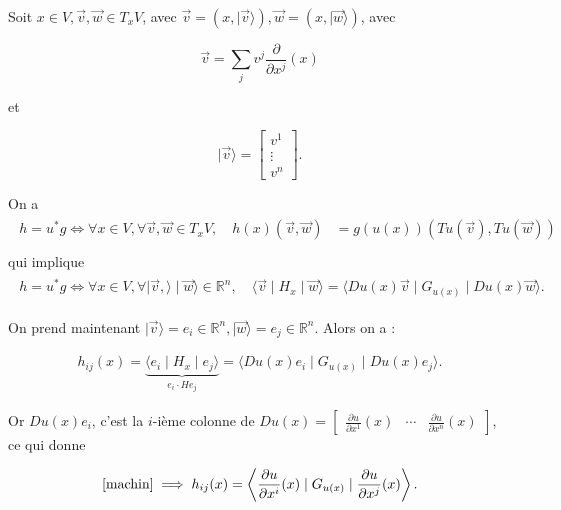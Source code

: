 \documentclass[french]{article}
\theoremstyle{definition}
\newcommand{\R}{\mathbb{R}}
\begin{document}
\medskip

Soit \(x \in V,  \vec{v}, \vec{w} \in T_x V\), avec \(\vec{v} = (x,\mid \vec{v} \rangle), \vec{w} = (x, \mid \vec{w} \rangle)\), avec

\[\vec{v}  = \sum_{j}^{} v ^{j} \frac{\partial  }{\partial x ^{j}}(x)\]

et

\[\mid \vec{v} \rangle = \begin{bmatrix}
  v ^{1} \\
  \vdots \\
  v ^{n}
\end{bmatrix}.\]

On a
\begin{gather*}
\begin{aligned}
h = u ^{*}g \iff \forall x \in V, \forall \vec{v}, \vec{w} \in T_x V,\quad  h(x)(\vec{v}, \vec{w}) & = g(u(x))(T u (\vec{v}), T u (\vec{w})) \\ &  \end{aligned}
\end{gather*}
qui implique
\begin{gather*}
\begin{aligned}
h = u ^{*}g \iff \forall x \in V, \forall \mid \vec{v},\rangle \mid  \vec{w} \rangle \in \R^n ,\quad  \langle \vec{v} \mid H_x \mid  \vec{w}\rangle  = \langle D u(x)\vec{v} \mid G_{u(x)} \mid D u(x)\vec{w}\rangle.
\end{aligned}
\end{gather*}

On prend maintenant \(\mid \vec{v} \rangle = e_i \in \mathbb{R}^n, \mid \vec{w} \rangle = e_j \in \mathbb{R}^n\). Alors on a :

\begin{gather}\label{machin}
h _{ij}(x) =  \underbrace{\langle e_i \mid  H_x \mid e_j \rangle}_{e_i \cdot H e_j} =  \langle D u(x)e_i \mid G_{u(x)} \mid D u(x)e_j\rangle.
\end{gather}

Or \(D u(x)e_i\), c'est la \(i\)-ième colonne de \(  D u(x) = \begin{bmatrix} \displaystyle \frac{\partial u }{\partial x ^{1}}(x) & \displaystyle \cdots & \displaystyle \frac{\partial u }{\partial x ^{n}}(x)  \end{bmatrix} \), ce qui donne

\begin{gather*}
  \ref{machin} \implies h_{ij}(x) = \left\langle \frac{\partial u }{\partial x ^{i}}(x) \mid G_{u(x)} \mid \frac{\partial u }{\partial x ^{j}}(x)   \right\rangle.
\end{gather*}
\end{document}
